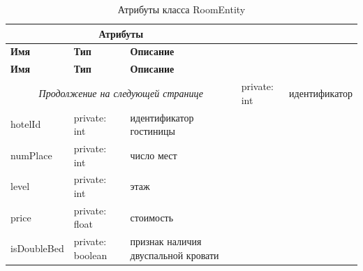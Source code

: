 \begin{longtable}{| p{3cm} | p{5cm} | p{8cm} |}
	\caption{Атрибуты класса RoomEntity}
	\label{tbl:room-entity} \\
	\hline
	
	\multicolumn{3}{|c|}{\textbf{Атрибуты}} \\
	\hline
	
	\textbf{Имя} & \textbf{Тип} & \textbf{Описание} \\
	\hline
	\endfirsthead
	
	\hline
	\textbf{Имя} & \textbf{Тип} & \textbf{Описание} \\
	\hline
	\endhead
	
	\hline
	\multicolumn{3}{c}{\textit{Продолжение на следующей странице}}
	\endfoot
	\hline
	\endlastfoot
	
	id
	&
	private: int
	&
	идентификатор \\
	\hline
	
	hotelId
	&
	private: int
	&
	идентификатор гостиницы \\
	\hline
	
	numPlace
	&
	private: int
	&
	число мест \\
	\hline
	
	level
	&
	private: int
	&
	этаж \\
	\hline
	
	price
	&
	private: float
	&
	стоимость \\
	\hline
	
	isDoubleBed
	&
	private: boolean
	&
	признак наличия двуспальной кровати \\
\end{longtable}


